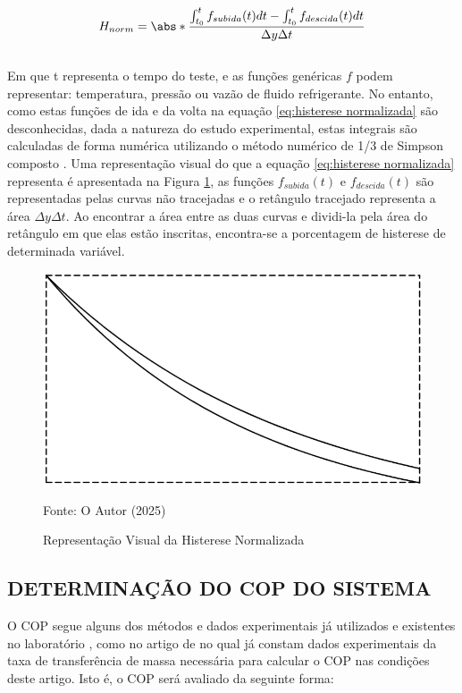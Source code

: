 \begin{equation}
    H_{norm} = \abs*{{\frac{\int_{t_0} ^t  f_{subida}(t) dt - \int_{t_0} ^t  f_{descida}(t) dt   }{\Delta y\Delta t }}}
    \label{eq:histerese normalizada}
\end{equation}
\\
Em que t representa o tempo do teste, e as funções genéricas $f$ podem representar: temperatura, pressão ou vazão de fluido refrigerante. No entanto, como estas funções de ida e da volta na equação \ref{eq:histerese normalizada} são desconhecidas, dada a natureza do estudo experimental, estas integrais são calculadas de forma numérica utilizando o método numérico de 1/3 de Simpson composto \cite{ChapraNumerico}. Uma representação visual do que a equação \ref{eq:histerese normalizada} representa é apresentada na Figura \ref{fig:representação visual da histerese normalizada}, as funções $f_{subida}(t)$ e $f_{descida}(t)$ são representadas pelas curvas não tracejadas e o retângulo tracejado representa a área $\Delta y \Delta t$. Ao encontrar a área entre as duas curvas e dividi-la pela área do retângulo em que elas estão inscritas, encontra-se a porcentagem de histerese de determinada variável.

\begin{figure}[h]
    \centering
    \includegraphics[width=0.75\linewidth]{FigurasdoTexto/Representação visual da histerese.png}
    \caption{Representação Visual da Histerese Normalizada}
    \label{fig:representação visual da histerese normalizada}
    {\footnotesize Fonte: O Autor (2025)}
\end{figure}


\subsection{\MakeUppercase{Determinação do COP do Sistema}} \label{subsec:Determinação do COP do Sistema}

O COP segue alguns dos métodos e dados experimentais já utilizados e existentes no laboratório \textcite{reve2023}, como no artigo de \textcite{ExperimentalThermalPerformance} no qual já constam dados experimentais da taxa de transferência de massa necessária para calcular o COP nas condições deste artigo. Isto é, o COP será avaliado da seguinte forma:

